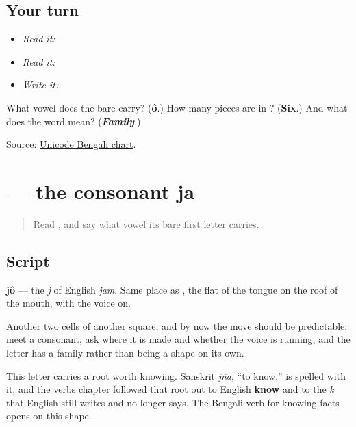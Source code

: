 \subsection*{Your turn}
\begin{itemize}
\raggedright
  \item \emph{Read it:} 
  \item \emph{Read it:} 
  \item \emph{Write it:} 
\end{itemize}

\begin{tcolorbox}[breakable,colback=teal!4,colframe=teal!35!black,title={Before you move on}]
What vowel does the bare \textbf{} carry? (\textbf{ô}.) How many pieces are in \textbf{}? (\textbf{Six}.) And what does the word mean? (\emph{\textbf{Family}}.)

Source: \href{https://www.unicode.org/charts/PDF/U0980.pdf}{Unicode Bengali chart}.
\end{tcolorbox}
\section[jô]{ — the consonant ja}

\label{lesson:BN-W04-ja}



\begin{quote}
Read \textbf{}, and say what vowel its bare first letter carries.
\end{quote}

\subsection*{Script}
\begin{quote}
\end{quote}

\textbf{jô} — the \emph{j} of English \emph{jam}. Same place as \textbf{}, the flat of the tongue on the roof of the mouth, with the voice on.

Another two cells of another square, and by now the move should be predictable: meet a consonant, ask where it is made and whether the voice is running, and the letter has a family rather than being a shape on its own.

This letter carries a root worth knowing. Sanskrit \emph{jñā}, \textquotedblleft{}to know,\textquotedblright{} is spelled with it, and the verbs chapter followed that root out to English \textbf{know} and to the \emph{k} that English still writes and no longer says. The Bengali verb for knowing facts opens on this shape.

